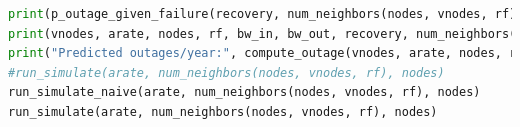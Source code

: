 \documentclass{article}
\begin{document}
\begin{lstlisting}[language=Python]
print(p_outage_given_failure(recovery, num_neighbors(nodes, vnodes, rf), arate))
print(vnodes, arate, nodes, rf, bw_in, bw_out, recovery, num_neighbors(nodes, vnodes, rf))
print("Predicted outages/year:", compute_outage(vnodes, arate, nodes, rf, bw_in, bw_out))
#run_simulate(arate, num_neighbors(nodes, vnodes, rf), nodes)
run_simulate_naive(arate, num_neighbors(nodes, vnodes, rf), nodes)
run_simulate(arate, num_neighbors(nodes, vnodes, rf), nodes)
\end{lstlisting}
\end{document}

